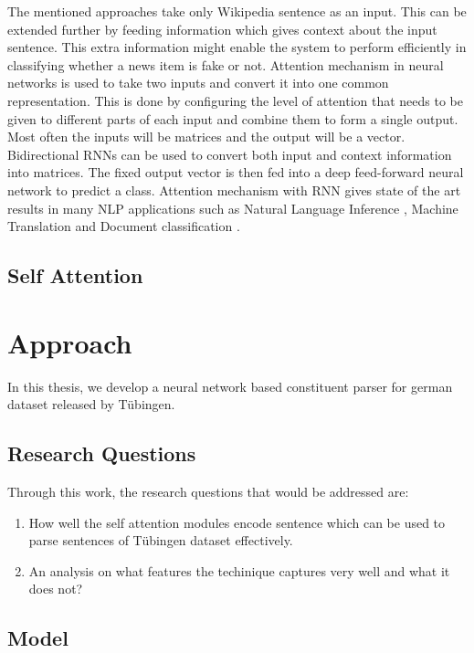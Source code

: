 \documentclass[a4paper, 11pt]{article}
\begin{document}
The mentioned approaches take only Wikipedia sentence as an input. This can be extended further by feeding information which gives context about the input sentence. This extra information might enable the system to perform efficiently in classifying whether a news item is fake or not. Attention mechanism in neural networks is used to take two inputs and convert it into one common representation. This is done by configuring the level of attention that needs to be given to different parts of each input and combine them to form a single output. Most often the inputs will be matrices and the output will be a vector. Bidirectional RNNs can be used to convert both input and context information into matrices. The fixed output vector is then fed into a deep feed-forward neural network to predict a class. Attention mechanism with RNN gives state of the art results in many NLP applications such as Natural Language Inference \parencite{Parikh2016}, Machine Translation \parencite{Bahdanau2014} and Document classification \parencite{Yang2016}.

\subsection{Self Attention}


\section{Approach}  

In this thesis, we develop a neural network based constituent parser for german dataset released by Tübingen.

\subsection{Research Questions}

Through this work, the research questions that would be addressed are:
\begin{enumerate}
\item  How well the self attention modules encode sentence which can be used to parse sentences of Tübingen dataset effectively.
\item An analysis on what features the techinique captures very well and what it does not?
\end{enumerate}

\subsection{Model}
\end{document}
